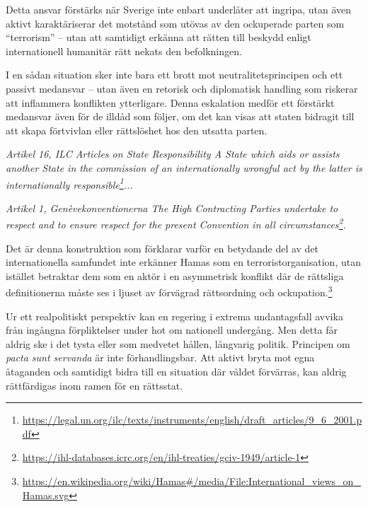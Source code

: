\documentclass[12pt]{article}
\newcommand{\lagrum}[1]{\par\vspace{3mm}\textit{#1}\par\vspace{5mm}}
\begin{document}
Detta ansvar förstärks när Sverige inte enbart underlåter att ingripa, utan även aktivt karaktäriserar det motstånd som utövas av den ockuperade parten som ``terrorism'' – utan att samtidigt erkänna att rätten till beskydd enligt internationell humanitär rätt nekats den befolkningen.

I en sådan situation sker inte bara ett brott mot neutralitetsprincipen och ett passivt medansvar – utan även en retorisk och diplomatisk handling som riskerar att inflammera konflikten ytterligare. Denna eskalation medför ett förstärkt medansvar även för de illdåd som följer, om det kan visas att staten bidragit till att skapa förtvivlan eller rättslöshet hos den utsatta parten.

\lagrum{Artikel 16, ILC Articles on State Responsibility\quad 
A State which aids or assists another State in the commission of an internationally wrongful act by the latter is internationally responsible\footnote{\url{https://legal.un.org/ilc/texts/instruments/english/draft_articles/9_6_2001.pdf}}...}

\lagrum{Artikel 1, Genèvekonventionerna\quad 
The High Contracting Parties undertake to respect and to ensure respect for the present Convention in all circumstances\footnote{\url{https://ihl-databases.icrc.org/en/ihl-treaties/gciv-1949/article-1}}.}


Det är denna konstruktion som förklarar varför en betydande del av det internationella samfundet inte erkänner Hamas som en terroristorganisation, utan istället betraktar dem som en aktör i en asymmetrisk konflikt där de rättsliga definitionerna måste ses i ljuset av förvägrad rättsordning och ockupation.\footnote{\url{https://en.wikipedia.org/wiki/Hamas\#/media/File:International_views_on_Hamas.svg}}

Ur ett realpolitiskt perspektiv kan en regering i extrema undantagsfall avvika från ingångna förpliktelser under hot om nationell undergång. Men detta får aldrig ske i det tysta eller som medvetet hållen, långvarig politik. Principen om \textit{pacta sunt servanda} är inte förhandlingsbar. Att aktivt bryta mot egna åtaganden och samtidigt bidra till en situation där våldet förvärras, kan aldrig rättfärdigas inom ramen för en rättsstat.
\end{document}
